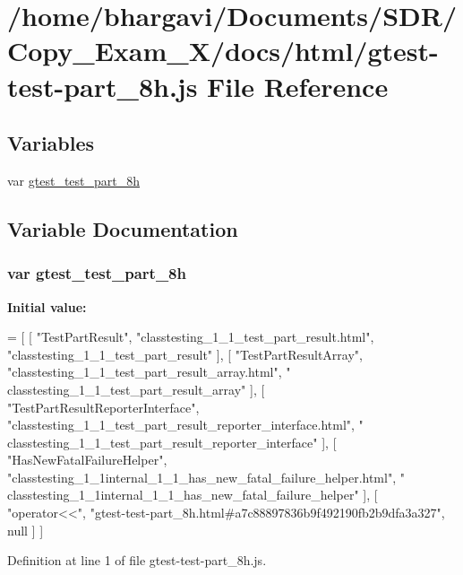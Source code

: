 \hypertarget{gtest-test-part__8h_8js}{}\section{/home/bhargavi/\+Documents/\+S\+D\+R/\+Copy\+\_\+\+Exam\+\_\+X/docs/html/gtest-\/test-\/part\+\_\+8h.js File Reference}
\label{gtest-test-part__8h_8js}
\subsection*{Variables}
\begin{DoxyCompactItemize}
\item 
var \hyperlink{gtest-test-part__8h_8js_a0226af9ad9d4f1faf0ba511c6ca5c5fe}{gtest\+\_\+test\+\_\+part\+\_\+8h}
\end{DoxyCompactItemize}


\subsection{Variable Documentation}
\subsubsection[{\texorpdfstring{gtest\+\_\+test\+\_\+part\+\_\+8h}{gtest_test_part_8h}}]{\setlength{\rightskip}{0pt plus 5cm}var gtest\+\_\+test\+\_\+part\+\_\+8h}\hypertarget{gtest-test-part__8h_8js_a0226af9ad9d4f1faf0ba511c6ca5c5fe}{}\label{gtest-test-part__8h_8js_a0226af9ad9d4f1faf0ba511c6ca5c5fe}
{\bfseries Initial value\+:}
\begin{DoxyCode}
=
[
    [ \textcolor{stringliteral}{"TestPartResult"}, \textcolor{stringliteral}{"classtesting\_1\_1\_test\_part\_result.html"}, \textcolor{stringliteral}{"classtesting\_1\_1\_test\_part\_result"} ],
    [ \textcolor{stringliteral}{"TestPartResultArray"}, \textcolor{stringliteral}{"classtesting\_1\_1\_test\_part\_result\_array.html"}, \textcolor{stringliteral}{"
      classtesting\_1\_1\_test\_part\_result\_array"} ],
    [ \textcolor{stringliteral}{"TestPartResultReporterInterface"}, \textcolor{stringliteral}{"classtesting\_1\_1\_test\_part\_result\_reporter\_interface.html"}, \textcolor{stringliteral}{"
      classtesting\_1\_1\_test\_part\_result\_reporter\_interface"} ],
    [ \textcolor{stringliteral}{"HasNewFatalFailureHelper"}, \textcolor{stringliteral}{"classtesting\_1\_1internal\_1\_1\_has\_new\_fatal\_failure\_helper.html"}, \textcolor{stringliteral}{"
      classtesting\_1\_1internal\_1\_1\_has\_new\_fatal\_failure\_helper"} ],
    [ \textcolor{stringliteral}{"operator<<"}, \textcolor{stringliteral}{"gtest-test-part\_8h.html#a7c88897836b9f492190fb2b9dfa3a327"}, null ]
]
\end{DoxyCode}


Definition at line 1 of file gtest-\/test-\/part\+\_\+8h.\+js.

